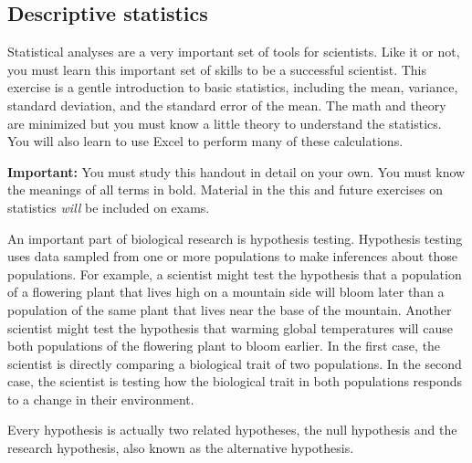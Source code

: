 \documentclass[12pt]{exam}
\begin{document}
\subsection*{Descriptive statistics}

Statistical analyses are a very important set of tools for scientists. Like it or not, you must learn this important set of skills to be a successful scientist. This exercise is a gentle introduction to basic statistics, including the mean, variance, standard deviation, and the standard error of the mean. The math and theory are minimized but you must know a little theory to understand the statistics.  You will also learn to use Excel to perform many of these calculations.

\textbf{Important:} You must study this handout in detail on your own. You must know the meanings of all terms in bold. Material in the this and future exercises on statistics \emph{will} be included on exams.

An important part of biological research is hypothesis testing. Hypothesis
testing uses data sampled from one or more populations to make
inferences about those populations. For example, a scientist
might test the hypothesis that a population of a flowering plant that lives high on 
a mountain side will bloom later than a population of the same plant that
lives near the base of the mountain. Another scientist might test the hypothesis
that warming global temperatures will cause both populations of the flowering plant to 
bloom earlier.  In the first case, the scientist is directly comparing a biological
trait of two populations. In the second case, the scientist is testing how
the biological trait in both populations responds to a change in their environment.


Every hypothesis is actually two related hypotheses, the null hypothesis 
and the research hypothesis, also known as the alternative hypothesis.
\end{document}
